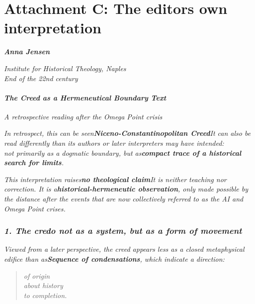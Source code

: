 \documentclass[
]{article}
\begin{document}
\section{\texorpdfstring{Attachment C: \textbf{The editor\textquotesingle s own interpretation}}{Attachment C: The editor\textquotesingle s own interpretation}}\label{attachment-c-the-editors-own-interpretation}

\emph{\textbf{Anna Jensen}}

\emph{Institute for Historical Theology, Naples\\
End of the 22nd century}

\paragraph{\texorpdfstring{\emph{\textbf{The Creed as a Hermeneutical Boundary Text}}}{The Creed as a Hermeneutical Boundary Text}}\label{the-creed-as-a-hermeneutical-boundary-text}

\emph{A retrospective reading after the Omega Point crisis}

\emph{In retrospect, this can be seen\textbf{Niceno-Constantinopolitan Creed}It can also be read differently than its authors or later interpreters may have intended:\\
not primarily as a dogmatic boundary, but as\textbf{compact trace of a historical search for limits}.}

\emph{This interpretation raises\textbf{no theological claim}It is neither teaching nor correction. It is a\textbf{historical-hermeneutic observation}, only made possible by the distance after the events that are now collectively referred to as the AI \hspace{0pt}\hspace{0pt}and Omega Point crises.}

\subsubsection{\texorpdfstring{\emph{\textbf{1. The credo not as a system, but as a form of movement}}}{1. The credo not as a system, but as a form of movement}}\label{the-credo-not-as-a-system-but-as-a-form-of-movement}

\emph{Viewed from a later perspective, the creed appears less as a closed metaphysical edifice than as\textbf{Sequence of condensations}, which indicate a direction:}

\begin{quote}
\emph{of origin\\
about history\\
to completion.}
\end{quote}
\end{document}
